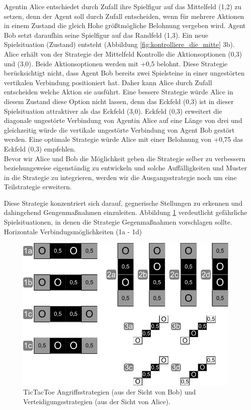 Agentin Alice entschiedet durch Zufall ihre Spielfigur auf das Mittelfeld (1,2) zu setzen, denn der Agent soll durch Zufall entscheiden, wenn für mehrere Aktionen in einem Zustand die gleich Hohe größtmögliche Belohnung vergeben wird. Agent Bob setzt daraufhin seine Spielfigur auf das Randfeld (1,3). Ein neue Spielsituation (Zustand) entsteht (Abbildung \ref{fig:kontrolliere_die_mitte} 3b). Alice erhält von der Strategie der Mittelfeld Kontrolle die Aktionsoptionen (0,3) und (3,0). Beide Aktionsoptionen werden mit +0,5 belohnt. Diese Strategie berücksichtigt nicht, dass Agent Bob bereits zwei Spielsteine in einer ungestörten vertikalen Verbindung positioniert hat. Daher kann Alice durch Zufall entscheiden welche Aktion sie ausführt. Eine bessere Strategie würde Alice in diesem Zustand diese Option nicht lassen, denn das Eckfeld (0,3) ist in dieser Spielsituation attraktiver als das Eckfeld (3,0). Eckfeld (0,3) erweitert die diagonale ungestörte Verbindung von Agentin Alice auf eine Länge von drei und gleichzeitig würde die vertikale ungestörte Verbindung von Agent Bob gestört werden. Eine optimale Strategie würde Alice mit einer Belohnung von +0,75 das Eckfeld (0,3) empfehlen. \\ 

Bevor wir Alice und Bob die Möglichkeit geben die Strategie selber zu verbessern beziehungsweise eigenständig zu entwickeln und solche Auffälligkeiten und Muster in die Strategie zu integrieren, werden wir die Ausgangsstrategie noch um eine Teilstrategie erweitern. \\


Diese Strategie konzentriert sich darauf, gegnerische Stellungen zu erkennen und dahingehend Gengenmaßnahmen einzuleiten. Abbildung \ref{fig:verteidigung_ist_angriff} verdeutlicht gefährliche Spielsituationen, in denen die Strategie Gegenmaßnahmen vorschlagen sollte. Horizontale Verbindugsmöglichkeiten (1a - 1d) 

\begin{figure}[!htbp]
  \centering
  \includegraphics[scale = 0.8]{inhalt/abbildungen/verteidigung_ist_angriff.pdf}
  \caption{TicTacToe Angriffsstrategien (aus der Sicht von Bob) und Verteidigungsstrategien (aus der Sicht von Alice).}
  \label{fig:verteidigung_ist_angriff}
\end{figure}

